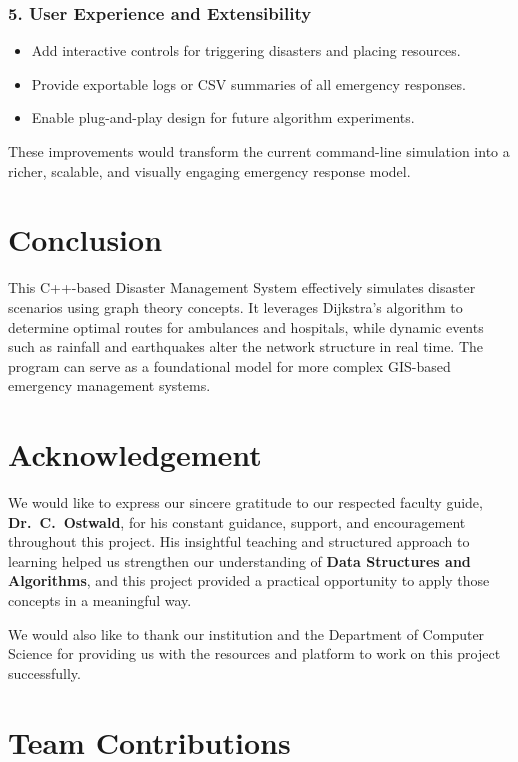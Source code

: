 \documentclass[12pt,a4paper]{report}
\begin{document}
\subsection*{5. User Experience and Extensibility}
\begin{itemize}
    \item Add interactive controls for triggering disasters and placing resources.
    \item Provide exportable logs or CSV summaries of all emergency responses.
    \item Enable plug-and-play design for future algorithm experiments.
\end{itemize}

These improvements would transform the current command-line simulation into a richer, scalable, and visually engaging emergency response model.


\chapter{Conclusion}

This C++-based Disaster Management System effectively simulates disaster scenarios using graph theory concepts.
It leverages Dijkstra’s algorithm to determine optimal routes for ambulances and hospitals,
while dynamic events such as rainfall and earthquakes alter the network structure in real time.
The program can serve as a foundational model for more complex GIS-based emergency management systems.

\chapter{Acknowledgement}

We would like to express our sincere gratitude to our respected faculty guide, 
\textbf{Dr.~C.~Ostwald}, for his constant guidance, support, and encouragement throughout 
this project. His insightful teaching and structured approach to learning helped us 
strengthen our understanding of \textbf{Data Structures and Algorithms}, and this project 
provided a practical opportunity to apply those concepts in a meaningful way.

We would also like to thank our institution and the Department of Computer Science 
for providing us with the resources and platform to work on this project successfully.

\chapter{Team Contributions}
\end{document}
